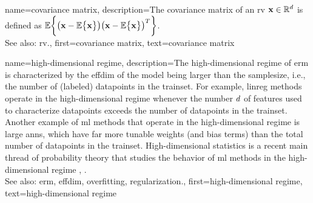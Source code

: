 {name={covariance matrix}, 
	description={The covariance matrix of an \gls{rv} ${\bf x} \in \mathbb{R}^{d}$ 
		is defined as $\mathbb{E} \bigg \{ \big( {\bf x} - \mathbb{E} \big\{ {\bf x} \big\} \big)  \big({\bf x} - \mathbb{E} \big\{ {\bf x} \big\} \big)^{T} \bigg\}$.
				\\
		See also: \gls{rv}.},
	first={covariance matrix},
	text={covariance matrix} 
}
	
{name={high-dimensional regime}, 
 description={The 
		high-dimensional regime of \gls{erm} is characterized by the \gls{effdim} of the \gls{model} 
		being larger than the \gls{samplesize}, i.e., the number of (labeled) \glspl{datapoint} in the \gls{trainset}. 
		For example, \gls{linreg} methods operate in the high-dimensional regime whenever the number $d$ of \glspl{feature} 
		used to characterize \glspl{datapoint} exceeds the number of \glspl{datapoint} in the \gls{trainset}. 
		Another example of \gls{ml} methods that operate in the high-dimensional regime is large \glspl{ann}, which have 
		far more tunable \gls{weights} (and bias terms) than the total number of \glspl{datapoint} in the \gls{trainset}. 
		High-dimensional statistics is a recent main thread of \gls{probability} theory that studies the 
		behavior of \gls{ml} methods in the high-dimensional regime \cite{Wain2019}, \cite{BuhlGeerBook}.
				\\
		See also: \gls{erm}, \gls{effdim}, \gls{overfitting}, \gls{regularization}.},
   first={high-dimensional regime},
   text={high-dimensional regime} 
}


